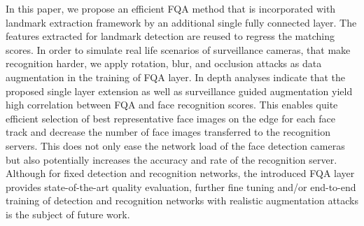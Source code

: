 \documentclass[runningheads]{llncs}
\begin{document}
In this paper, we propose an efficient FQA method that is incorporated with landmark extraction framework by an additional single fully connected layer. The features extracted for landmark detection are reused to regress the matching scores. In order to simulate real life scenarios of surveillance cameras, that make recognition harder, we apply rotation, blur, and occlusion attacks as data augmentation in the training of FQA layer. In depth analyses indicate that the proposed single layer extension as well as surveillance guided augmentation yield high correlation between FQA and face recognition scores. This enables quite efficient selection of best representative face images on the edge for each face track and decrease the number of face images transferred to the recognition servers. This does not only ease the network load of the face detection cameras but also potentially increases the accuracy and rate of the recognition server. Although for fixed detection and recognition networks, the introduced FQA layer provides state-of-the-art quality evaluation, further fine tuning and/or end-to-end training of detection and recognition networks with realistic augmentation attacks is the subject of future work.






\clearpage


\end{document}
